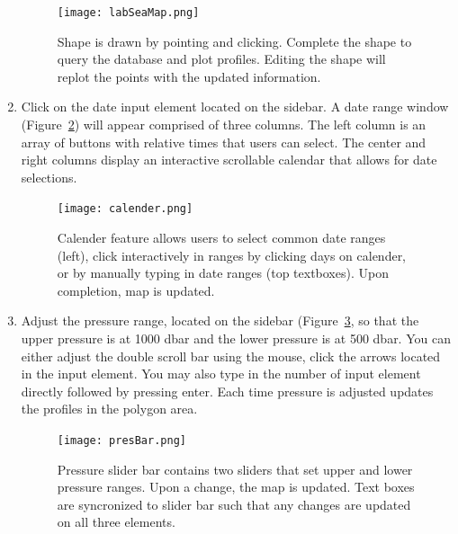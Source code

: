 \begin{enumerate}
\begin{figure}[H]
\begin{minipage}{6in}
\centering
\texttt{[image: labSeaMap.png]}
\caption{\label{fig:lab_sea} Shape is drawn by pointing and clicking. Complete the shape to query the database and plot profiles. Editing the shape will replot the points with the updated information.}
\end{minipage}
\end{figure}

\item Click on the date input element located on the sidebar. A date range window (Figure~\ref{fig:calender}) will appear comprised of three columns. The left column is an array of buttons with relative times that users can select. The center and right columns display an interactive scrollable calendar that allows for date selections.

\begin{figure}[H]
\begin{minipage}{6in}
\centering
\texttt{[image: calender.png]}
\caption{\label{fig:calender} Calender feature allows users to select common date ranges (left), click interactively in ranges by clicking days on calender, or by manually typing in date ranges (top textboxes). Upon completion, map is updated. }
\end{minipage}
\end{figure}

\item Adjust the pressure range, located on the sidebar (Figure~\ref{fig:pres_bar}, so that the upper pressure is at 1000 dbar and the lower pressure is at 500 dbar. You can either adjust the double scroll bar using the mouse, click the arrows located in the input element. You may also type in the number of input element directly followed by pressing enter. Each time pressure is adjusted updates the profiles in the polygon area.

\begin{figure}[H]
\begin{minipage}{6in}
\centering
\texttt{[image: presBar.png]}
\caption{\label{fig:pres_bar} Pressure slider bar contains two sliders that set upper and lower pressure ranges. Upon a change, the map is updated. Text boxes are syncronized to slider bar such that any changes are updated on all three elements.}
\end{minipage}
\end{figure}


\end{enumerate}
